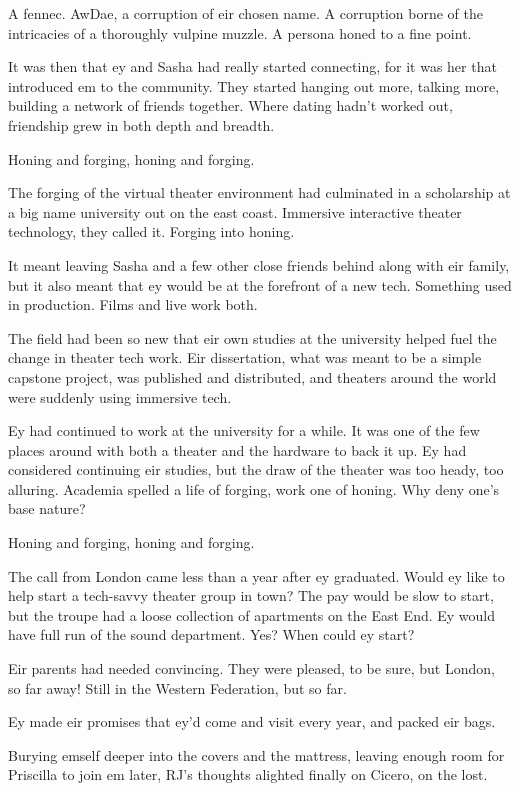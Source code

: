 A fennec. AwDae, a corruption of eir chosen name. A corruption borne of the intricacies of a thoroughly vulpine muzzle. A persona honed to a fine point.

It was then that ey and Sasha had really started connecting, for it was her that introduced em to the community. They started hanging out more, talking more, building a network of friends together. Where dating hadn't worked out, friendship grew in both depth and breadth.

Honing and forging, honing and forging.

The forging of the virtual theater environment had culminated in a scholarship at a big name university out on the east coast. Immersive interactive theater technology, they called it. Forging into honing.

It meant leaving Sasha and a few other close friends behind along with eir family, but it also meant that ey would be at the forefront of a new tech. Something used in production. Films and live work both.

The field had been so new that eir own studies at the university helped fuel the change in theater tech work. Eir dissertation, what was meant to be a simple capstone project, was published and distributed, and theaters around the world were suddenly using immersive tech.

Ey had continued to work at the university for a while. It was one of the few places around with both a theater and the hardware to back it up. Ey had considered continuing eir studies, but the draw of the theater was too heady, too alluring. Academia spelled a life of forging, work one of honing. Why deny one's base nature?

Honing and forging, honing and forging.

The call from London came less than a year after ey graduated. Would ey like to help start a tech-savvy theater group in town? The pay would be slow to start, but the troupe had a loose collection of apartments on the East End. Ey would have full run of the sound department. Yes? When could ey start?

Eir parents had needed convincing. They were pleased, to be sure, but London, so far away! Still in the Western Federation, but so far.

Ey made eir promises that ey'd come and visit every year, and packed eir bags.

Burying emself deeper into the covers and the mattress, leaving enough room for Priscilla to join em later, RJ's thoughts alighted finally on Cicero, on the lost.

